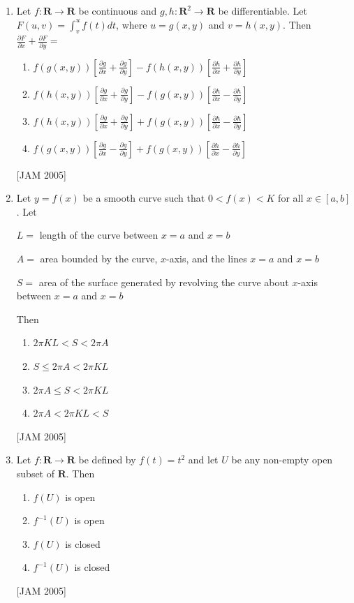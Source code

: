 \begin{enumerate}
 
\item Let $f: \boldsymbol{R} \longrightarrow \boldsymbol{R}$ be continuous and $g, h: \boldsymbol{R}^{2} \longrightarrow \boldsymbol{R}$ be differentiable. Let $F(u, v)=\int_{v}^{u} f(t) d t$, where $u=g(x, y)$ and $v=h(x, y)$. Then $\frac{\partial F}{\partial x}+\frac{\partial F}{\partial y}=$
\begin{enumerate} 
    \item $f(g(x, y))\left[\frac{\partial g}{\partial x}+\frac{\partial g}{\partial y}\right]-f(h(x, y))\left[\frac{\partial h}{\partial x}+\frac{\partial h}{\partial y}\right]$
    \item $f(h(x, y))\left[\frac{\partial g}{\partial x}+\frac{\partial g}{\partial y}\right]-f(g(x, y))\left[\frac{\partial h}{\partial x}-\frac{\partial h}{\partial y}\right]$
    \item $f(h(x, y))\left[\frac{\partial g}{\partial x}+\frac{\partial g}{\partial y}\right]+f(g(x, y))\left[\frac{\partial h}{\partial x}-\frac{\partial h}{\partial y}\right]$
    \item $f(g(x, y))\left[\frac{\partial g}{\partial x}-\frac{\partial g}{\partial y}\right]+f(g(x, y))\left[\frac{\partial h}{\partial x}-\frac{\partial h}{\partial y}\right]$ 
 \end{enumerate}
 \hfill [JAM 2005]



\item Let $y=f(x)$ be a smooth curve such that $0<f(x)<K$ for all $x \in[a, b]$. Let

$L=$ length of the curve between $x=a$ and $x=b$

$A=$ area bounded by the curve, $x$-axis, and the lines $x=a$ and $x=b$

$S=$ area of the surface generated by revolving the curve about $x$-axis between $x=a$ and $x=b$

Then
\begin{enumerate} 
    \item $2 \pi K L<S<2 \pi A$
    \item $S \leq 2 \pi A<2 \pi K L$
    \item $2 \pi A \leq S<2 \pi K L$
    \item $2 \pi A<2 \pi K L<S$
 \end{enumerate}
 \hfill [JAM 2005]


 
\item  Let $f: \boldsymbol{R} \longrightarrow \boldsymbol{R}$ be defined by $f(t)=t^{2}$ and let $U$ be any non-empty open subset of $\boldsymbol{R}$. Then
\begin{enumerate}
    \item $f(U)$ is open
    \item $f^{-1}(U)$ is open
    \item $f(U)$ is closed
    \item $f^{-1}(U)$ is closed 
 \end{enumerate}
 \hfill [JAM 2005]
 

\end{enumerate}
